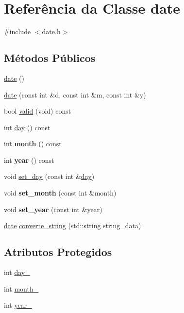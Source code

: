 \hypertarget{classdate}{}\section{Referência da Classe date}
\label{classdate}


{\ttfamily \#include $<$date.\+h$>$}

\subsection*{Métodos Públicos}
\begin{DoxyCompactItemize}
\item 
\hyperlink{classdate_ace1e9bd1562330f4d03a385ee0cc2eba}{date} ()
\item 
\hyperlink{classdate_a9954370dd412bd9b521697d1ff18dd92}{date} (const int \&d, const int \&m, const int \&y)
\item 
bool \hyperlink{classdate_a95b10c2203568baea43f9847ca354113}{valid} (void) const
\item 
int \hyperlink{classdate_a9c9bfe2a9f48360110b43b493695e42d}{day} () const
\item 
\mbox{\label{classdate_af42f12f10f40ffa46ce6a3e530d32fa7}} 
int {\bfseries month} () const
\item 
\mbox{\label{classdate_abd7356a9b60a255e5e991db910e14e91}} 
int {\bfseries year} () const
\item 
void \hyperlink{classdate_ac0a3fdbc68f887db60856aff3527ef43}{set\+\_\+day} (const int \&\hyperlink{classdate_a9c9bfe2a9f48360110b43b493695e42d}{day})
\item 
\mbox{\label{classdate_a982e937d320c3f63b82eaaa4868a01c0}} 
void {\bfseries set\+\_\+month} (const int \&month)
\item 
\mbox{\label{classdate_afd5251dbf79a032fda4c7fe69bfd1cf5}} 
void {\bfseries set\+\_\+year} (const int \&year)
\item 
\hyperlink{classdate}{date} \hyperlink{classdate_aba8e450097ac4393f0a2c4987891309a}{converte\+\_\+string} (std\+::string string\+\_\+data)
\end{DoxyCompactItemize}
\subsection*{Atributos Protegidos}
\begin{DoxyCompactItemize}
\item 
int \hyperlink{classdate_a8b6a07e98bfbaae3970841ec1d1854b8}{day\+\_\+}
\item 
int \hyperlink{classdate_a71822c3ffdc179d9592449ddcc25af90}{month\+\_\+}
\item 
int \hyperlink{classdate_ae61f71866a55ae344f9dcde1bd25b214}{year\+\_\+}
\end{DoxyCompactItemize}


